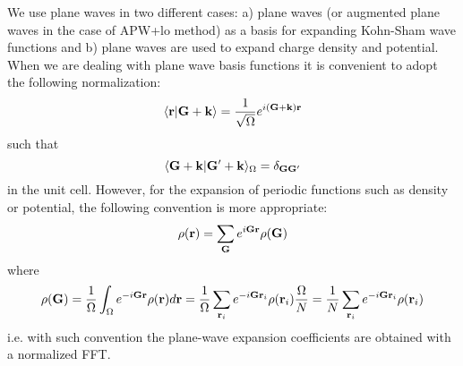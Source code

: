 We use plane waves in two different cases\+: a) plane waves (or augmented plane waves in the case of A\+P\+W+lo method) as a basis for expanding Kohn-\/\+Sham wave functions and b) plane waves are used to expand charge density and potential. When we are dealing with plane wave basis functions it is convenient to adopt the following normalization\+: \[ \langle {\bf r} |{\bf G+k} \rangle = \frac{1}{\sqrt \Omega} e^{i{\bf (G+k)r}} \] such that \[ \langle {\bf G+k} |{\bf G'+k} \rangle_{\Omega} = \delta_{{\bf GG'}} \] in the unit cell. However, for the expansion of periodic functions such as density or potential, the following convention is more appropriate\+: \[ \rho({\bf r}) = \sum_{\bf G} e^{i{\bf Gr}} \rho({\bf G}) \] where \[ \rho({\bf G}) = \frac{1}{\Omega} \int_{\Omega} e^{-i{\bf Gr}} \rho({\bf r}) d{\bf r} = \frac{1}{\Omega} \sum_{{\bf r}_i} e^{-i{\bf Gr}_i} \rho({\bf r}_i) \frac{\Omega}{N} = \frac{1}{N} \sum_{{\bf r}_i} e^{-i{\bf Gr}_i} \rho({\bf r}_i) \] i.\+e. with such convention the plane-\/wave expansion coefficients are obtained with a normalized F\+F\+T. 